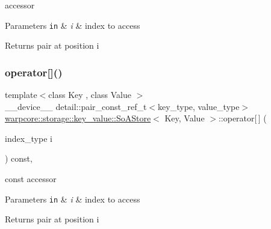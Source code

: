 accessor 


\begin{DoxyParams}[1]{Parameters}
\mbox{\tt in}  & {\em i} & index to access \\
\hline
\end{DoxyParams}
\begin{DoxyReturn}{Returns}
pair at position {\ttfamily i} 
\end{DoxyReturn}
\mbox{\label{classwarpcore_1_1storage_1_1key__value_1_1SoAStore_a0ffbe21819280b32a78ad98dd8a7dd43}} 
\subsubsection{\texorpdfstring{operator[]()}{operator[]()}\hspace{0.1cm}{\footnotesize\ttfamily [2/2]}}
{\footnotesize\ttfamily template$<$class Key , class Value $>$ \\
\+\_\+\+\_\+device\+\_\+\+\_\+ detail\+::pair\+\_\+const\+\_\+ref\+\_\+t$<$key\+\_\+type, value\+\_\+type$>$ \hyperlink{classwarpcore_1_1storage_1_1key__value_1_1SoAStore}{warpcore\+::storage\+::key\+\_\+value\+::\+So\+A\+Store}$<$ Key, Value $>$\+::operator\mbox{[}$\,$\mbox{]} (\begin{DoxyParamCaption}\item[{index\+\_\+type}]{i }\end{DoxyParamCaption}) const\hspace{0.3cm}{\ttfamily [inline]}, {\ttfamily [noexcept]}}



const accessor 


\begin{DoxyParams}[1]{Parameters}
\mbox{\tt in}  & {\em i} & index to access \\
\hline
\end{DoxyParams}
\begin{DoxyReturn}{Returns}
pair at position {\ttfamily i} 
\end{DoxyReturn}
\mbox{\label{classwarpcore_1_1storage_1_1key__value_1_1SoAStore_afe3a33107f19d895ed0aa78bfedd2de0}} 
